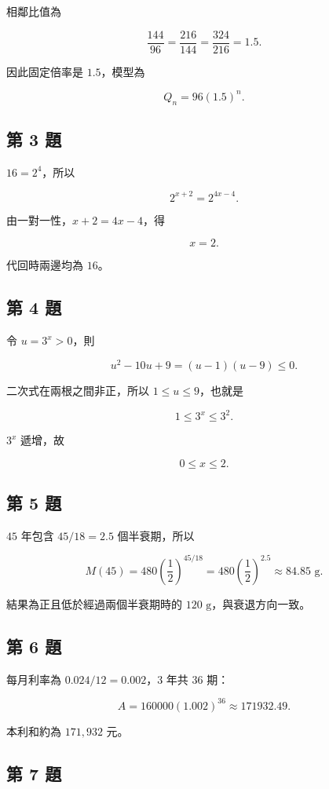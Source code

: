 \documentclass[11pt,a4paper]{article}
\begin{document}
相鄰比值為

\[
\frac{144}{96}=\frac{216}{144}=\frac{324}{216}=1.5.
\]

因此固定倍率是 \(1.5\)，模型為

\[
Q_n=96(1.5)^n.
\]

\subsection{第 3 題}\label{ux7b2c-3-ux984c}

\(16=2^4\)，所以

\[
2^{x+2}=2^{4x-4}.
\]

由一對一性，\(x+2=4x-4\)，得

\[
x=2.
\]

代回時兩邊均為 \(16\)。

\subsection{第 4 題}\label{ux7b2c-4-ux984c}

令 \(u=3^x>0\)，則

\[
u^2-10u+9=(u-1)(u-9)\le0.
\]

二次式在兩根之間非正，所以 \(1\le u\le9\)，也就是

\[
1\le3^x\le3^2.
\]

\(3^x\) 遞增，故

\[
0\le x\le2.
\]

\subsection{第 5 題}\label{ux7b2c-5-ux984c}

\(45\) 年包含 \(45/18=2.5\) 個半衰期，所以

\[
M(45)=480\left(\frac12\right)^{45/18}
=480\left(\frac12\right)^{2.5}
\approx84.85\text{ g}.
\]

結果為正且低於經過兩個半衰期時的 \(120\text{ g}\)，與衰退方向一致。

\subsection{第 6 題}\label{ux7b2c-6-ux984c}

每月利率為 \(0.024/12=0.002\)，\(3\) 年共 \(36\) 期：

\[
A=160000(1.002)^{36}\approx171932.49.
\]

本利和約為 \(171{,}932\) 元。

\subsection{第 7 題}\label{ux7b2c-7-ux984c}
\end{document}
